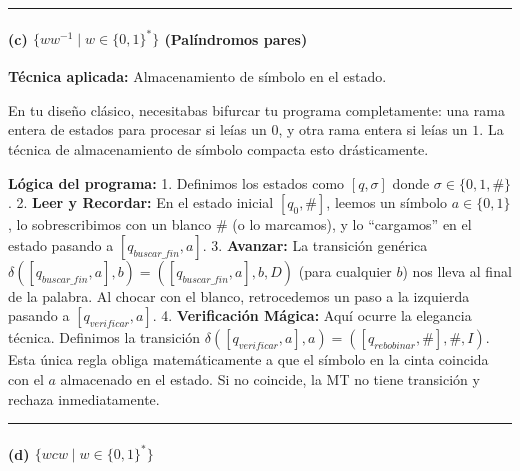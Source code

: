 \documentclass[12pt]{book} %
\begin{document}
\begin{center}\rule{0.5\linewidth}{0.5pt}\end{center}

\hypertarget{c-ww-1-mid-w-in-0-1-paluxedndromos-pares}{%
\paragraph{\texorpdfstring{(c) \(\{ww^{-1} \mid w \in \{0, 1\}^*\}\)
(Palíndromos
pares)}{(c) \textbackslash\{ww\^{}\{-1\} \textbackslash mid w \textbackslash in \textbackslash\{0, 1\textbackslash\}\^{}*\textbackslash\} (Palíndromos pares)}}\label{c-ww-1-mid-w-in-0-1-paluxedndromos-pares}}

\textbf{Técnica aplicada:} Almacenamiento de símbolo en el estado.

En tu diseño clásico, necesitabas bifurcar tu programa completamente:
una rama entera de estados para procesar si leías un \(0\), y otra rama
entera si leías un \(1\). La técnica de almacenamiento de símbolo
compacta esto drásticamente.

\textbf{Lógica del programa:} 1. Definimos los estados como
\([q, \sigma]\) donde \(\sigma \in \{0, 1, \#\}\). 2. \textbf{Leer y
Recordar:} En el estado inicial \([q_0, \#]\), leemos un símbolo
\(a \in \{0,1\}\), lo sobrescribimos con un blanco \(\#\) (o lo
marcamos), y lo ``cargamos'' en el estado pasando a
\([q_{buscar\_fin}, a]\). 3. \textbf{Avanzar:} La transición genérica
\(\delta([q_{buscar\_fin}, a], b) = ([q_{buscar\_fin}, a], b, D)\) (para
cualquier \(b\)) nos lleva al final de la palabra. Al chocar con el
blanco, retrocedemos un paso a la izquierda pasando a
\([q_{verificar}, a]\). 4. \textbf{Verificación Mágica:} Aquí ocurre la
elegancia técnica. Definimos la transición
\(\delta([q_{verificar}, a], a) = ([q_{rebobinar}, \#], \#, I)\). Esta
única regla obliga matemáticamente a que el símbolo en la cinta coincida
con el \(a\) almacenado en el estado. Si no coincide, la MT no tiene
transición y rechaza inmediatamente.

\begin{center}\rule{0.5\linewidth}{0.5pt}\end{center}

\hypertarget{d-wcw-mid-w-in-0-1}{%
\paragraph{\texorpdfstring{(d)
\(\{wcw \mid w \in \{0, 1\}^*\}\)}{(d) \textbackslash\{wcw \textbackslash mid w \textbackslash in \textbackslash\{0, 1\textbackslash\}\^{}*\textbackslash\}}}\label{d-wcw-mid-w-in-0-1}}
\end{document}
